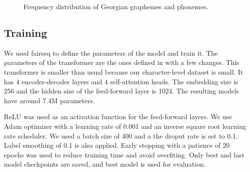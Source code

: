 \documentclass[11pt,a4paper]{article}
\begin{document}
\begin{figure}
    \centering
    \caption{Frequency distribution of Georgian graphemes and phonemes.}
    \label{fig:geo_graphemes_phonemes}
\end{figure}

\subsection{Training}

We used fairseq to define the parameters of the model and train it. The parameters of the transformer are the ones defined in \citet{wu2021applying} with a few changes. This transformer is smaller than usual because our character-level dataset is small. It has 4 encoder-decoder layers and 4 self-attention heads. The embedding size is 256 and the hidden size of the feed-forward layer is 1024. The resulting models have around 7.4M parameters.

ReLU was used as an activation function for the feed-forward layers. We use Adam optimizer with a learning rate of 0.001 and an inverse square root learning rate scheduler. We used a batch size of 400 and a the droput rate is set to 0.1. Label smoothing of 0.1 is also applied. Early stopping with a patience of 20 epochs was used to reduce training time and avoid overfiting. Only best and last model checkpoints are saved, and best model is used for evaluation.
\end{document}
